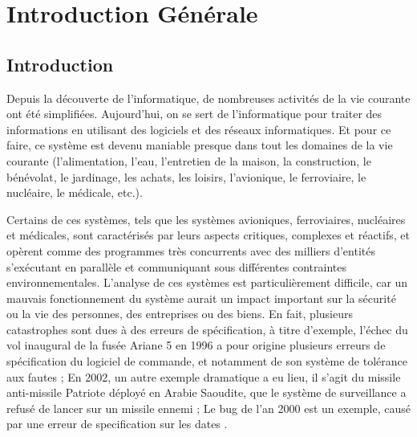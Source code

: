 \chapter*{Introduction Générale}

\section*{Introduction}
Depuis la découverte de l’informatique, de nombreuses activités de la vie courante ont été simplifiées. Aujourd'hui, on se sert de l’informatique pour traiter des informations en utilisant des logiciels et des réseaux informatiques. Et pour ce faire, ce système est devenu maniable presque dans tout les domaines de la vie courante (l'alimentation, l'eau, l’entretien de la maison, la construction, le bénévolat, le jardinage, les achats, les loisirs, l'avionique, le ferroviaire, le nucléaire, le médicale, etc.).

Certains de ces systèmes, tels que les systèmes avioniques, ferroviaires, nucléaires et médicales, sont caractérisés par leurs aspects critiques, complexes et réactifs, et opèrent comme des programmes très concurrents avec des milliers d’entités s’exécutant en parallèle et communiquant sous différentes contraintes environnementales. L’analyse de ces systèmes est particulièrement difficile, car un mauvais fonctionnement du système aurait un impact important sur la sécurité ou la vie des personnes, des entreprises ou des biens. En fait, plusieurs catastrophes sont dues à des erreurs de spécification, à titre d'exemple, l'échec du vol inaugural de la fusée Ariane 5 en 1996 a pour origine  plusieurs erreurs de spécification du logiciel de commande, et notamment de son système de tolérance aux fautes \citep{arian5}; En 2002, un autre exemple dramatique a eu lieu, il s'agit du missile anti-missile Patriote déployé en Arabie Saoudite, que le système de surveillance a refusé de lancer sur un missile ennemi \citep{patriot}; Le bug de l'an 2000 est un exemple, causé par une erreur de specification sur les dates \citep{bug2000}.

